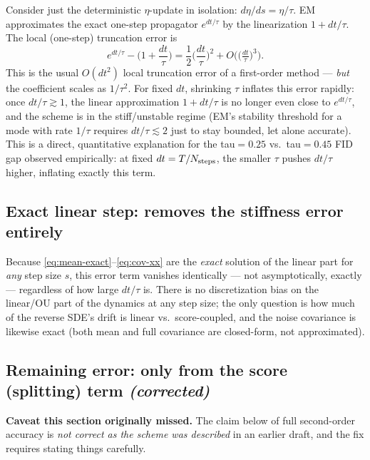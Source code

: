 \documentclass[11pt]{article}
\begin{document}
Consider just the deterministic $\eta$-update in isolation:
$d\eta/ds = \eta/\tau$. EM approximates the exact one-step propagator
$e^{dt/\tau}$ by the linearization $1+dt/\tau$. The local (one-step)
truncation error is
\begin{equation}
e^{dt/\tau} - \Big(1+\frac{dt}{\tau}\Big)
= \frac{1}{2}\Big(\frac{dt}{\tau}\Big)^2 + O\!\Big(\big(\tfrac{dt}{\tau}\big)^3\Big).
\label{eq:lte-em}
\end{equation}
This is the usual $O(dt^2)$ local truncation error of a first-order method —
\emph{but} the coefficient scales as $1/\tau^2$. For fixed $dt$, shrinking
$\tau$ inflates this error rapidly: once $dt/\tau \gtrsim 1$, the linear
approximation $1+dt/\tau$ is no longer even close to $e^{dt/\tau}$, and the
scheme is in the stiff/unstable regime (EM's stability threshold for a mode
with rate $1/\tau$ requires $dt/\tau \lesssim 2$ just to stay bounded, let
alone accurate). This is a direct, quantitative explanation for the
tau$=0.25$ vs.\ tau$=0.45$ FID gap observed empirically: at fixed
$dt = T/N_{\rm steps}$, the smaller $\tau$ pushes $dt/\tau$ higher, inflating
exactly this term.

\subsection{Exact linear step: removes the stiffness error entirely}

Because \eqref{eq:mean-exact}--\eqref{eq:cov-xx} are the \emph{exact} solution
of the linear part for \emph{any} step size $s$, this error term vanishes
identically — not asymptotically, exactly — regardless of how large $dt/\tau$
is. There is no discretization bias on the linear/OU part of the dynamics at
any step size; the only question is how much of the reverse SDE's drift is
linear vs.\ score-coupled, and the noise covariance is likewise exact (both
mean and full covariance are closed-form, not approximated).

\subsection{Remaining error: only from the score (splitting) term
\emph{(corrected)}}

\textbf{Caveat this section originally missed.} The claim below of full
second-order accuracy is \emph{not correct as the scheme was described} in an
earlier draft, and the fix requires stating things carefully.
\end{document}
